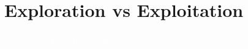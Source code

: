 \documentclass[11pt,table]{beamer}
\begin{document}
\section{Exploration vs Exploitation}
{
\begin{frame}
\centering
\Huge
\textcolor{white}{Exploration vs Exploitation}
\thispagestyle{empty}
\end{frame}
}


%
%
%
%
%
\end{document}
